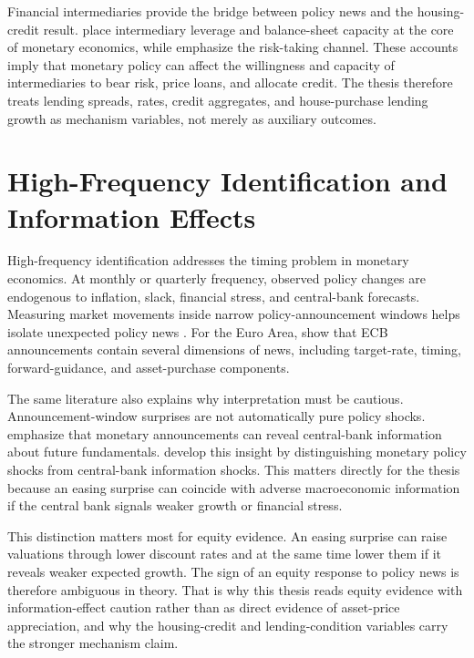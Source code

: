 Financial intermediaries provide the bridge between policy news and the housing-credit result. \textcite{AdrianShin2010} place intermediary leverage and balance-sheet capacity at the core of monetary economics, while \textcite{BorioZhu2012} emphasize the risk-taking channel. These accounts imply that monetary policy can affect the willingness and capacity of intermediaries to bear risk, price loans, and allocate credit. The thesis therefore treats lending spreads, rates, credit aggregates, and house-purchase lending growth as mechanism variables, not merely as auxiliary outcomes.

\section{High-Frequency Identification and Information Effects}

High-frequency identification addresses the timing problem in monetary economics. At monthly or quarterly frequency, observed policy changes are endogenous to inflation, slack, financial stress, and central-bank forecasts. Measuring market movements inside narrow policy-announcement windows helps isolate unexpected policy news \parencite{Kuttner2001,GertlerKaradi2015}. For the Euro Area, \textcite{Altavilla2019} show that ECB announcements contain several dimensions of news, including target-rate, timing, forward-guidance, and asset-purchase components.

The same literature also explains why interpretation must be cautious. Announcement-window surprises are not automatically pure policy shocks. \textcite{NakamuraSteinsson2018} emphasize that monetary announcements can reveal central-bank information about future fundamentals. \textcite{JarocinskiKaradi2020} develop this insight by distinguishing monetary policy shocks from central-bank information shocks. This matters directly for the thesis because an easing surprise can coincide with adverse macroeconomic information if the central bank signals weaker growth or financial stress.

This distinction matters most for equity evidence. An easing surprise can raise valuations through lower discount rates and at the same time lower them if it reveals weaker expected growth. The sign of an equity response to policy news is therefore ambiguous in theory. That is why this thesis reads equity evidence with information-effect caution rather than as direct evidence of asset-price appreciation, and why the housing-credit and lending-condition variables carry the stronger mechanism claim.

